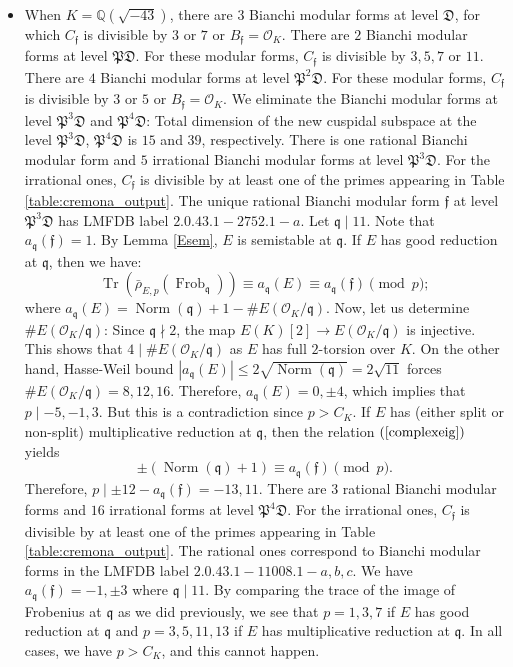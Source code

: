 \documentclass[]{article}
\newcommand {\QQ}{{\mathbb{Q}}}
\newcommand {\mcalO}{{\mathcal{O}}}
\newcommand {\mfp}{{\mathfrak{P}}}
\DeclareMathOperator{\Norm}{Norm}
\newcounter{cases}
\begin{document}
\begin{itemize}
    \item When $K=\QQ(\sqrt{-43})$, there are $3$ Bianchi modular forms at level $\mathfrak{D}$, for which $C_{\mathfrak{f}}$ is divisible by $3$ or $7$ or $B_{\mathfrak{f}}=\mcalO_K$. There are $2$ Bianchi modular forms at level $\mfp\mathfrak{D}$. For these modular forms, $C_{\mathfrak{f}}$ is divisible by $3,5,7$ or $11$. There are $4$ Bianchi modular forms at level $\mfp^2\mathfrak{D}$. For these modular forms, $C_{\mathfrak{f}}$ is divisible by $3$ or $5$ or $B_{\mathfrak{f}}=\mcalO_K$. We eliminate the Bianchi modular forms at level $\mfp^3\mathfrak{D}$ and $\mfp^4\mathfrak{D}$: Total dimension of the new cuspidal subspace at the level $\mfp^3\mathfrak{D}$, $\mfp^4\mathfrak{D}$ is $15$ and $39$, respectively. There is one rational Bianchi modular form and $5$ irrational Bianchi modular forms at level $\mfp^3\mathfrak{D}$. For the irrational ones, $C_{\mathfrak{f}}$ is divisible by at least one of the primes appearing in Table \ref{table:cremona_output}. The unique rational Bianchi modular form $\mathfrak{f}$ at level $\mfp^3\mathfrak{D}$ has LMFDB label $2.0.43.1-2752.1-a$. Let $\mathfrak{q}\mid 11$. Note that $a_\mathfrak{q}(\mathfrak{f})=1$. By Lemma \ref{Esem}, $E$ is semistable at $\mathfrak{q}$. If $E$ has good reduction at $\mathfrak{q}$, then we have:
$$
\operatorname{Tr}\left(\bar{\rho}_{E, p}\left(\operatorname{Frob}_{\mathfrak{q}}\right)\right) \equiv a_{\mathfrak{q}}(E)\equiv a_{\mathfrak{q}}(\mathfrak{f}) \pmod{p};
$$where $a_{\mathfrak{q}}(E)=\Norm(\mathfrak{q})+1-\#E\left(\mcalO_K/\mathfrak{q}\right)$. Now, let us determine $\#E\left(\mcalO_K/\mathfrak{q}\right)$: Since $\mathfrak{q}\nmid 2$, the map $E(K)[2]\to E\left(\mcalO_K/\mathfrak{q}\right)$ is injective. This shows that $4\mid \#E\left(\mcalO_K/\mathfrak{q}\right)$ as $E$ has full $2$-torsion over $K$. On the other hand, Hasse-Weil bound $|a_{\mathfrak{q}}(E)|\le 2\sqrt{\Norm(\mathfrak{q})}=2\sqrt{11}$ forces $\#E\left(\mcalO_K/\mathfrak{q}\right)=8,12,16$. Therefore, $a_{\mathfrak{q}}(E)=0,\pm4$, which implies that $p\mid -5,-1,3$. But this is a contradiction since $p>C_K$. If $E$ has (either split or non-split) multiplicative reduction at $\mathfrak{q}$, then the relation $(\ref{complexeig})$ yields
$$\pm (\Norm(\mathfrak{q})+1)\equiv a_{\mathfrak{q}}(\mathfrak{f}) \pmod{p}.$$Therefore, $p\mid \pm12-a_{\mathfrak{q}}(\mathfrak{f})=-13,11$. There are $3$ rational Bianchi modular forms and $16$ irrational forms at level $\mfp^4\mathfrak{D}$. For the irrational ones, $C_{\mathfrak{f}}$ is divisible by at least one of the primes appearing in Table \ref{table:cremona_output}. The rational ones correspond to Bianchi modular forms in the LMFDB label $2.0.43.1-11008.1-a,b,c$. We have $a_{\mathfrak{q}}(\mathfrak{f})=-1,\pm 3$ where $\mathfrak{q}\mid 11$. By comparing the trace of the image of Frobenius at $\mathfrak{q}$ as we did previously, we see that $p=1,3,7$ if $E$ has good reduction at $\mathfrak{q}$ and $p=3,5,11,13$ if $E$ has multiplicative reduction at $\mathfrak{q}$. In all cases, we have $p>C_K$, and this cannot happen.

\end{itemize}
\end{document}

